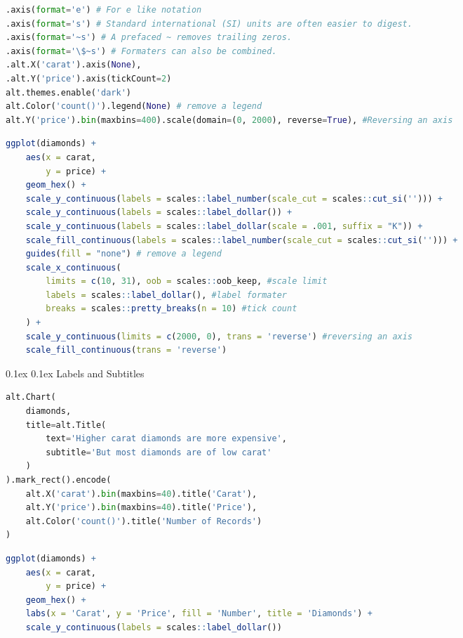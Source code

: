 \documentclass[8pt,landscape]{article}
\makeatletter
\renewcommand{\subsection}{\@startsection{subsection}{2}{0pt}%
    {0.1ex}%
    {0.1ex}%
    {\fontsize{8}{9}\bfseries\color{blue}}} %
\makeatother
\begin{document}
\begin{multicols}{3}
\begin{lstlisting}[language=Python]
.axis(format='e') # For e like notation
.axis(format='s') # Standard international (SI) units are often easier to digest. 
.axis(format='~s') # A prefaced ~ removes trailing zeros. 
.axis(format='\$~s') # Formaters can also be combined.
.alt.X('carat').axis(None),
.alt.Y('price').axis(tickCount=2) 
alt.themes.enable('dark')
alt.Color('count()').legend(None) # remove a legend 
alt.Y('price').bin(maxbins=400).scale(domain=(0, 2000), reverse=True), #Reversing an axis
\end{lstlisting}
\begin{lstlisting}[language=R]
ggplot(diamonds) +
    aes(x = carat,
        y = price) +
    geom_hex() +
    scale_y_continuous(labels = scales::label_number(scale_cut = scales::cut_si(''))) +
    scale_y_continuous(labels = scales::label_dollar()) +
    scale_y_continuous(labels = scales::label_dollar(scale = .001, suffix = "K")) +
    scale_fill_continuous(labels = scales::label_number(scale_cut = scales::cut_si(''))) +
    guides(fill = "none") # remove a legend 
    scale_x_continuous(
        limits = c(10, 31), oob = scales::oob_keep, #scale limit
        labels = scales::label_dollar(), #label formater
        breaks = scales::pretty_breaks(n = 10) #tick count
    ) + 
    scale_y_continuous(limits = c(2000, 0), trans = 'reverse') #reversing an axis
    scale_fill_continuous(trans = 'reverse')
\end{lstlisting}

\subsection{Labels and Subtitles }
\begin{lstlisting}[language=python]
alt.Chart(
    diamonds,
    title=alt.Title(
        text='Higher carat diamonds are more expensive',
        subtitle='But most diamonds are of low carat'
    )
).mark_rect().encode(
    alt.X('carat').bin(maxbins=40).title('Carat'),
    alt.Y('price').bin(maxbins=40).title('Price'),
    alt.Color('count()').title('Number of Records')
)
\end{lstlisting}

\begin{lstlisting}[language=R]
ggplot(diamonds) +
    aes(x = carat,
        y = price) +
    geom_hex() +
    labs(x = 'Carat', y = 'Price', fill = 'Number', title = 'Diamonds') +
    scale_y_continuous(labels = scales::label_dollar())
\end{lstlisting}


\end{multicols}
\end{document}
